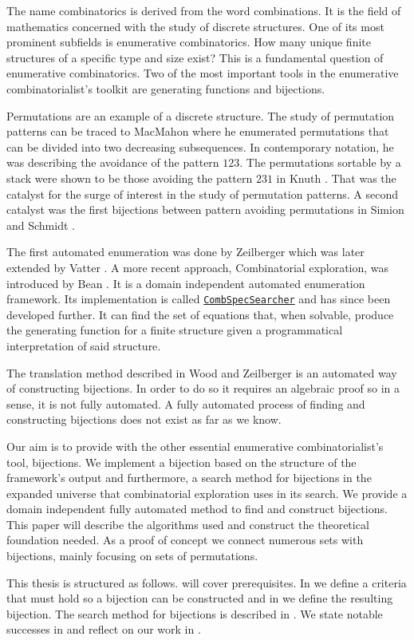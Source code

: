 \label{ch:introduction}
The name combinatorics is derived from the word combinations. It is the field of mathematics concerned with the study of discrete structures. One of its most prominent subfields is enumerative combinatorics. How many unique finite structures of a specific type and size exist? This is a fundamental question of enumerative combinatorics. Two of the most important tools in the enumerative combinatorialist's toolkit are generating functions and bijections.

Permutations are an example of a discrete structure. The study of permutation patterns can be traced to MacMahon \cite{MacMahon} where he enumerated permutations that can be divided into two decreasing subsequences. In contemporary notation, he was describing the avoidance of the pattern $123$. The permutations sortable by a stack were shown to be those avoiding the pattern $231$ in Knuth \cite{knuth:aocp1}. That was the catalyst for the surge of interest in the study of permutation patterns. A second catalyst was the first bijections between pattern avoiding permutations in Simion and Schmidt \cite{simionandschmidt}. 

The first automated enumeration was done by Zeilberger \cite{Zeilberger1998EnumerationSA} which was later extended by Vatter \cite{vatter_2008}. A more recent approach, Combinatorial exploration, was introduced by Bean \cite{BeanPhd:phd}. It is a domain independent automated enumeration framework. Its implementation is called \href{https://github.com/PermutaTriangle/comb_spec_searcher}{\texttt{CombSpecSearcher}} and has since been developed further. It can find the set of equations that, when solvable, produce the generating function for a finite structure given a programmatical interpretation of said structure.

The translation method described in Wood and Zeilberger \cite{wood_zeilberger} is an automated way of constructing bijections. In order to do so it requires an algebraic proof so in a sense, it is not fully automated. A fully automated process of finding and constructing bijections does not exist as far as we know.

Our aim is to provide \css{} with the other essential enumerative combinatorialist's tool, bijections. We implement a bijection based on the structure of the framework's output and furthermore, a search method for bijections in the expanded universe that combinatorial exploration uses in its search. We provide a domain independent fully automated method to find and construct bijections. This paper will describe the algorithms used and construct the theoretical foundation needed. As a proof of concept we connect numerous sets with bijections, mainly focusing on sets of permutations.

This thesis is structured as follows.  will cover prerequisites. In  we define a criteria that must hold so a bijection can be constructed and in  we define the resulting bijection. The search method for bijections is described in . We state notable successes in  and reflect on our work in .
